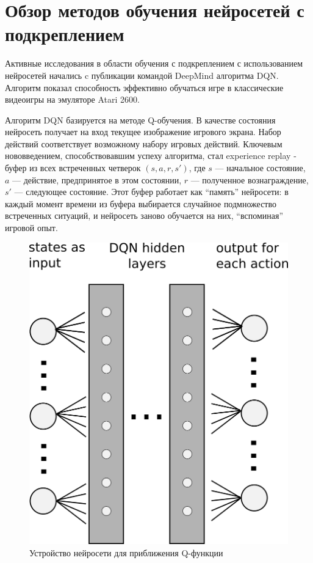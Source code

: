 \documentclass[]{itmo-student-thesis}
\begin{document}
\section{Обзор методов обучения нейросетей с подкреплением}

Активные исследования в области обучения с подкреплением с использованием
нейросетей начались c публикации командой DeepMind алгоритма
DQN\cite{deepmind-dqn-orig}. Алгоритм показал способность эффективно обучаться
игре в классические видеоигры на эмуляторе Atari 2600. 

Алгоритм DQN базируется на методе Q-обучения. В качестве состояния нейросеть
получает на вход текущее изображение игрового экрана. Набор действий
соответствует возможному набору игровых действий. Ключевым нововведением,
способствовавшим успеху алгоритма, стал experience replay - буфер из всех
встреченных четверок $(s, a, r, s')$, где $s$ --- начальное состояние, $a$ ---
действие, предпринятое в этом состоянии, $r$ --- полученное вознаграждение, $s'$
--- следующее состояние. Этот буфер работает как ``память'' нейросети: в каждый
момент времени из буфера выбирается случайное подмножество встреченных ситуаций,
и нейросеть заново обучается на них, ``вспоминая'' игровой опыт.

\begin{figure}[!h]
  \caption{Устройство нейросети для приближения Q-функции}\label{dqn-scheme}
  \centering
  \includegraphics{dqn-scheme}
\end{figure}
\end{document}
